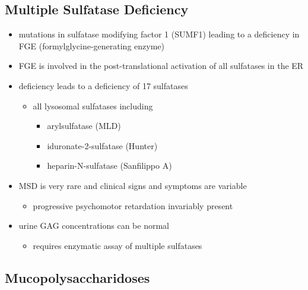 \documentclass[12pt]{scrartcl}
\begin{document}
\subsection{Multiple Sulfatase Deficiency}
\label{sec:orgd162f90}
\begin{itemize}
\item mutations in sulfatase modifying factor 1 (SUMF1) leading to a
deficiency in FGE (formylglycine-generating enzyme)
\item FGE is involved in the post-translational activation of all
sulfatases in the ER
\item deficiency leads to a deficiency of 17 sulfatases
\begin{itemize}
\item all lysosomal sulfatases including
\begin{itemize}
\item arylsulfatase (MLD)
\item iduronate-2-sulfatase (Hunter)
\item heparin-N-sulfatase (Sanfilippo A)
\end{itemize}
\end{itemize}
\item MSD is very rare and clinical signs and symptoms are variable
\begin{itemize}
\item progressive psychomotor retardation invariably present
\end{itemize}
\item urine GAG concentrations can be normal
\begin{itemize}
\item requires enzymatic assay of multiple sulfatases
\end{itemize}
\end{itemize}

\subsection{Mucopolysaccharidoses}
\label{sec:org78cf89c}
\end{document}
